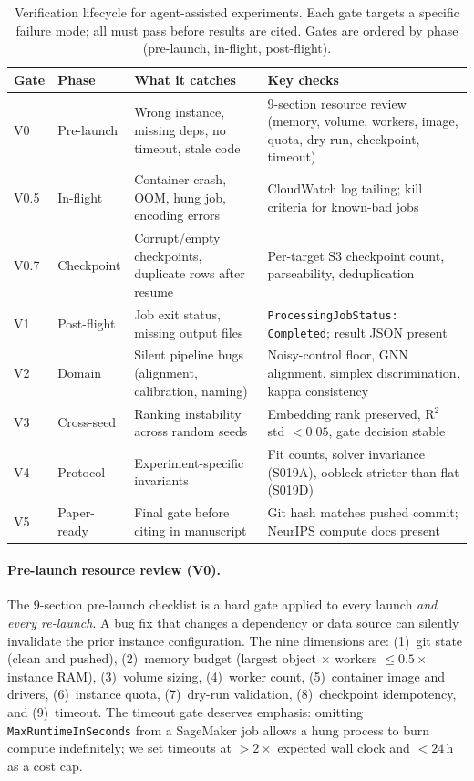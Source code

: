 \begin{table}[t]
\centering
\caption{Verification lifecycle for agent-assisted experiments. Each gate
  targets a specific failure mode; all must pass before results are cited.
  Gates are ordered by phase (pre-launch, in-flight, post-flight).}
\label{app:tab:verify-lifecycle}
\small
\begin{tabular}{@{}llll@{}}
\toprule
\textbf{Gate} & \textbf{Phase} & \textbf{What it catches} & \textbf{Key checks} \\
\midrule
V0   & Pre-launch  & Wrong instance, missing deps, no timeout, stale code &
  9-section resource review (memory, volume, workers, image, quota, dry-run, checkpoint, timeout) \\
V0.5 & In-flight   & Container crash, OOM, hung job, encoding errors &
  CloudWatch log tailing; kill criteria for known-bad jobs \\
V0.7 & Checkpoint  & Corrupt/empty checkpoints, duplicate rows after resume &
  Per-target S3 checkpoint count, parseability, deduplication \\
V1   & Post-flight & Job exit status, missing output files &
  \texttt{ProcessingJobStatus: Completed}; result JSON present \\
V2   & Domain      & Silent pipeline bugs (alignment, calibration, naming) &
  Noisy-control floor, GNN alignment, simplex discrimination, kappa consistency \\
V3   & Cross-seed  & Ranking instability across random seeds &
  Embedding rank preserved, R$^2$ std $<0.05$, gate decision stable \\
V4   & Protocol    & Experiment-specific invariants &
  Fit counts, solver invariance (S019A), oobleck stricter than flat (S019D) \\
V5   & Paper-ready & Final gate before citing in manuscript &
  Git hash matches pushed commit; NeurIPS compute docs present \\
\bottomrule
\end{tabular}
\end{table}

\paragraph{Pre-launch resource review (V0).}
The 9-section pre-launch checklist is a hard gate applied to every launch
\emph{and every re-launch}. A bug fix that changes a dependency or data
source can silently invalidate the prior instance configuration. The nine
dimensions are: (1)~git state (clean and pushed), (2)~memory budget
(largest object $\times$ workers $\leq 0.5 \times$ instance RAM),
(3)~volume sizing, (4)~worker count, (5)~container image and drivers,
(6)~instance quota, (7)~dry-run validation, (8)~checkpoint idempotency,
and (9)~timeout. The timeout gate deserves emphasis: omitting
\texttt{MaxRuntimeInSeconds} from a SageMaker job allows a hung process
to burn compute indefinitely; we set timeouts at $>2\times$ expected wall
clock and $<24$\,h as a cost cap.

